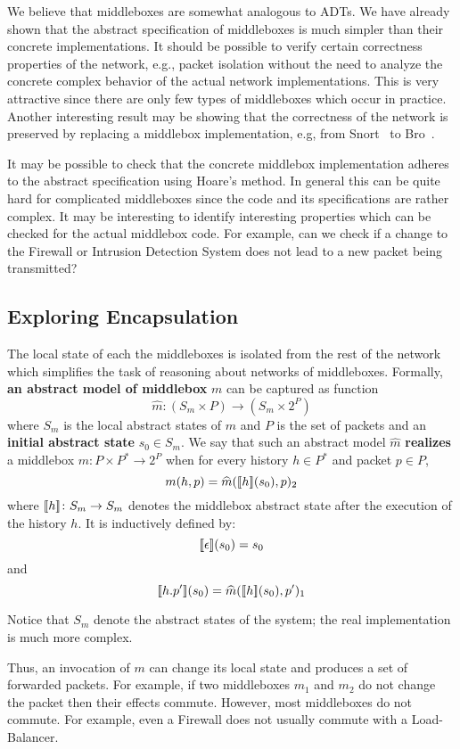 We believe that middleboxes are somewhat analogous to ADTs.
We have already shown that the abstract specification of middleboxes is much simpler than their concrete implementations.
It should be possible to verify certain correctness properties of the network, e.g., packet isolation without the need to analyze the concrete complex behavior of the actual network implementations.
This is very attractive since there are only few types of middleboxes which occur in practice.
Another interesting result may be showing that the correctness of the network is preserved by
replacing a middlebox implementation, e.g, from Snort~\cite{Snort} to Bro~\cite{Bro}.

It may be possible to check that the concrete middlebox implementation adheres to the abstract
specification using Hoare's method.
In general this can be quite hard for complicated middleboxes since the code and its specifications are rather complex.
It may be interesting to identify interesting properties which can be checked for the actual middlebox code.
For example, can we check if a change to the Firewall or Intrusion Detection System does not lead to a new packet being transmitted?

\subsection{Exploring Encapsulation}
The local state of each the middleboxes is isolated from the rest of the network which simplifies the task of reasoning about networks of middleboxes.
Formally, \textbf{an abstract model of middlebox} $m$ can be captured as function
\[
\hat{m}\colon (S_m \times P) \to (S_m \times 2^P)
\]
where $S_m$ is the local abstract states of $m$ and $P$ is the set of packets and
an \textbf{initial abstract state} $s_0 \in S_m$.
We say that such an abstract model $\hat{m}$ \textbf{realizes} a middlebox $m\colon P \times P^* \to 2^P$
when for every history $h \in P^*$ and packet $p \in P$,
\[
m(h, p) = \widehat{m}(\lbrack\!\lbrack h \rbrack\!\rbrack(s_0),p)_2
\]
where $\lbrack\!\lbrack h \rbrack\!\rbrack\colon S_m \to S_m$ denotes the middlebox abstract state after the execution of the history $h$.
It is inductively defined by:
\[
\lbrack\!\lbrack \epsilon \rbrack\!\rbrack(s_0) = s_0
\]
and
\[
\lbrack\!\lbrack h.p' \rbrack\!\rbrack(s_0) = \widehat{m}(\lbrack\!\lbrack h \rbrack\!\rbrack(s_0), p')_1
\]

Notice that $S_m$ denote the abstract states of the system; the real implementation is much more complex.


Thus, an invocation of $m$ can change its local state and produces a set of forwarded packets.
For example, if two middleboxes $m_1$ and $m_2$ do not change the packet then their effects commute.
However, most middleboxes do not commute.
For example, even a Firewall does not usually commute with a Load-Balancer.



